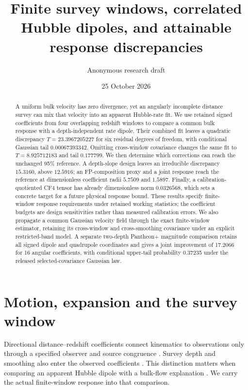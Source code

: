 \documentclass[aps,prd,reprint,onecolumn,superscriptaddress,nofootinbib]{revtex4-2}
\begin{document}
\title{Finite survey windows, correlated Hubble dipoles, and attainable response discrepancies}
\author{Anonymous research draft}
\noaffiliation
\date{25 October 2026}
\begin{abstract}
A uniform bulk velocity has zero divergence, yet an angularly incomplete distance survey can mix that velocity into an apparent Hubble-rate fit. We use retained signed coefficients from four overlapping redshift windows to compare a common bulk response with a depth-independent rate dipole. Their combined fit leaves a quadratic discrepancy $T=23.3967205227$ for six residual degrees of freedom, with conditional Gaussian tail $0.00067393342$. Omitting cross-window covariance changes the same fit to $T=8.925712183$ and tail $0.177799$. We then determine which corrections can reach the unchanged 95\% reference. A depth-slope design leaves an irreducible discrepancy $15.3160$, above $12.5916$; an FP-composition proxy and a joint response reach the reference at dimensionless coefficient radii $5.7509$ and $1.5897$. Finally, a calibration-quotiented CF4 tensor has already dimensionless norm $0.0326568$, which sets a concrete target for a future physical response bound. These results specify finite-window response requirements under retained working statistics; the coefficient budgets are design sensitivities rather than measured calibration errors.
We also propagate a common Gaussian velocity field through the exact
finite-window estimator, retaining its cross-window and cross-smoothing
covariance under an explicit restricted-band model. A separate two-depth
Pantheon+ magnitude comparison retains all signed dipole and quadrupole
coordinates and gives a joint improvement of 17.2066 for 16 angular
coefficients, with conditional upper-tail probability 0.37235 under the
released selected-covariance Gaussian law.

\end{abstract}
\maketitle


\section{Motion, expansion and the survey window}
Directional distance--redshift coefficients connect kinematics to observations only through a specified observer and source congruence \cite{heinesen,maartens}. Survey depth and smoothing also enter the observed coefficients \cite{adamek}. This distinction matters when comparing an apparent Hubble dipole with a bulk-flow explanation \cite{boubel}. We carry the actual finite-window response into that comparison.
\end{document}
